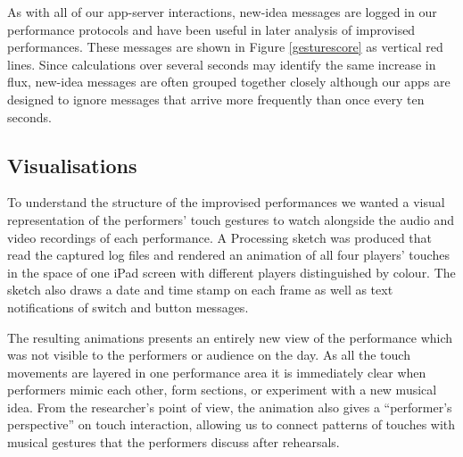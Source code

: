 \documentclass[graybox]{svmult}
\begin{document}
As with all of our app-server interactions, new-idea messages are
logged in our performance protocols and have been useful in later
analysis of improvised performances. These messages are shown in
Figure \ref{gesturescore} as vertical red lines. Since calculations
over several seconds may identify the same increase in flux, new-idea
messages are often grouped together closely although our apps are
designed to ignore messages that arrive more frequently than once
every ten seconds. 

\subsection{Visualisations}
\label{subsec:visualisations}

To understand the structure of the improvised performances we wanted a
visual representation of the performers' touch gestures to watch
alongside the audio and video recordings of each performance. A
Processing sketch was produced that read the captured log files and
rendered an animation of all four players' touches in the space of one
iPad screen with different players distinguished by colour. The sketch
also draws a date and time stamp on each frame as well as text
notifications of switch and button messages.

The resulting animations presents an entirely new view of the
performance which was not visible to the performers or audience on the
day. As all the touch movements are layered in one performance area it
is immediately clear when performers mimic each other, form sections,
or experiment with a new musical idea. From the researcher's point of
view, the animation also gives a ``performer's perspective'' on touch
interaction, allowing us to connect patterns of touches with musical
gestures that the performers discuss after rehearsals.
\end{document}
